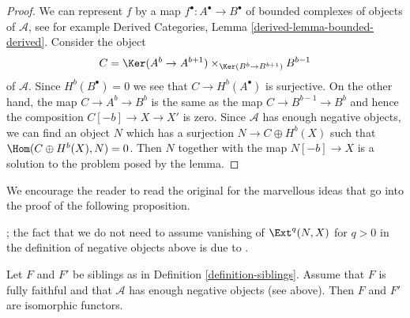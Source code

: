 \begin{proof}
We can represent $f$ by a map $f^\bullet : A^\bullet \to B^\bullet$
of bounded complexes of objects of $\mathcal{A}$, see for example
Derived Categories, Lemma \ref{derived-lemma-bounded-derived}.
Consider the object
$$
C = \Ker(A^b \to A^{b + 1}) \times_{\Ker(B^b \to B^{b + 1})} B^{b - 1}
$$
of $\mathcal{A}$. Since $H^b(B^\bullet) = 0$ we see that
$C \to H^b(A^\bullet)$ is surjective. On the other hand, the map
$C \to A^b \to B^b$ is the same as the map $C \to B^{b - 1} \to B^b$
and hence the composition $C[-b] \to X \to X'$ is zero.
Since $\mathcal{A}$ has enough negative objects, we can find an object $N$
which has a surjection $N \to C \oplus H^b(X)$ such that
$\Hom(C \oplus H^b(X), N) = 0$. Then $N$ together with the map
$N[-b] \to X$ is a solution to the problem posed by the lemma.
\end{proof}

\noindent
We encourage the reader to read the original
\cite[Proposition 2.16]{Orlov-K3} for the marvellous ideas
that go into the proof of the following proposition.

\begin{proposition}
\label{proposition-siblings-isomorphic}
\begin{reference}
\cite[Proposition 2.16]{Orlov-K3}; the fact that we do not need
to assume vanishing of $\Ext^q(N, X)$ for $q > 0$ in the definition
of negative objects above is due to \cite{Canonaco-Stellari}.
\end{reference}
Let $F$ and $F'$ be siblings as in Definition \ref{definition-siblings}.
Assume that $F$ is fully faithful and that $\mathcal{A}$ has enough
negative objects (see above). Then $F$ and $F'$ are isomorphic functors.
\end{proposition}

